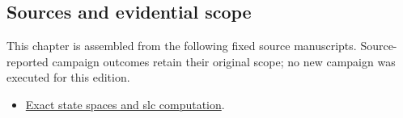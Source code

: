\subsection{Sources and evidential
scope}\label{viii-ch03-sources-and-evidential-scope}

This chapter is assembled from the following fixed source manuscripts.
Source-reported campaign outcomes retain their original scope; no new
campaign was executed for this edition.

\begin{itemize}
\tightlist
\item
  \href{https://github.com/iwtbotiwtwot/SAMA/blob/4c2b5dc1649da5900c90b90d0ce56c223dbb7717/vol_iii/02-slc/exact-state-spaces-and-slc-computation.md}{Exact
  state spaces and slc computation}.
\end{itemize}
